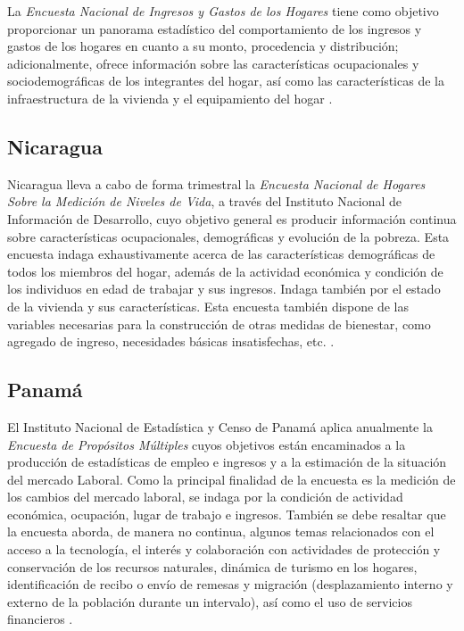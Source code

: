 \documentclass[
  12pt,
  spanish,
]{book}
\begin{document}
La \emph{Encuesta Nacional de Ingresos y Gastos de los Hogares} tiene como objetivo proporcionar un panorama estadístico del comportamiento de los ingresos y gastos de los hogares en cuanto a su monto, procedencia y distribución; adicionalmente, ofrece información sobre las características ocupacionales y sociodemográficas de los integrantes del hogar, así como las características de la infraestructura de la vivienda y el equipamiento del hogar \citep{INEGI2-MX}.

\hypertarget{nicaragua}{%
\subsection{Nicaragua}\label{nicaragua}}

Nicaragua lleva a cabo de forma trimestral la \emph{Encuesta Nacional de Hogares Sobre la Medición de Niveles de Vida}, a través del Instituto Nacional de Información de Desarrollo, cuyo objetivo general es producir información continua sobre características ocupacionales, demográficas y evolución de la pobreza. Esta encuesta indaga exhaustivamente acerca de las características demográficas de todos los miembros del hogar, además de la actividad económica y condición de los individuos en edad de trabajar y sus ingresos. Indaga también por el estado de la vivienda y sus características. Esta encuesta también dispone de las variables necesarias para la construcción de otras medidas de bienestar, como agregado de ingreso, necesidades básicas insatisfechas, etc. \citep{INIDE-NI}.

\hypertarget{panamuxe1}{%
\subsection{Panamá}\label{panamuxe1}}

El Instituto Nacional de Estadística y Censo de Panamá aplica anualmente la \emph{Encuesta de Propósitos Múltiples} cuyos objetivos están encaminados a la producción de estadísticas de empleo e ingresos y a la estimación de la situación del mercado Laboral. Como la principal finalidad de la encuesta es la medición de los cambios del mercado laboral, se indaga por la condición de actividad económica, ocupación, lugar de trabajo e ingresos. También se debe resaltar que la encuesta aborda, de manera no continua, algunos temas relacionados con el acceso a la tecnología, el interés y colaboración con actividades de protección y conservación de los recursos naturales, dinámica de turismo en los hogares, identificación de recibo o envío de remesas y migración (desplazamiento interno y externo de la población durante un intervalo), así como el uso de servicios financieros \citep{INEC-PA}.
\end{document}
